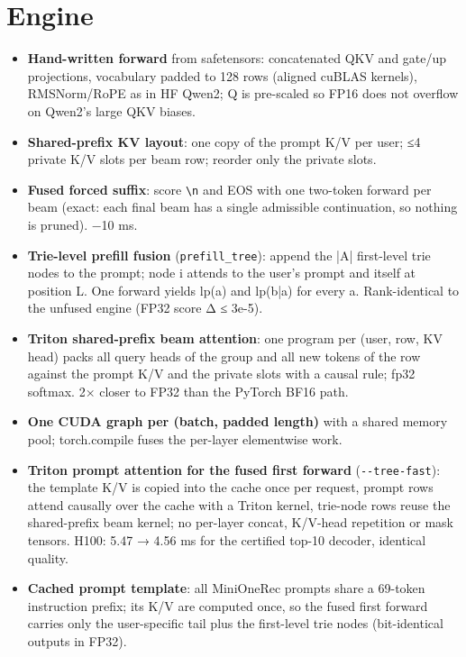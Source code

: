 \documentclass[11pt]{article}
\newcommand{\code}[1]{\texttt{#1}}
\begin{document}
\section{Engine}\label{sec:4}

\begin{itemize}
\item \textbf{Hand-written forward} from safetensors: concatenated QKV and gate/up projections, vocabulary padded to 128 rows (aligned cuBLAS kernels), RMSNorm/RoPE as in HF Qwen2; Q is pre-scaled so FP16 does not overflow on Qwen2's large QKV biases.
\item \textbf{Shared-prefix KV layout}: one copy of the prompt K/V per user; ≤4 private K/V slots per beam row; reorder only the private slots.
\item \textbf{Fused forced suffix}: score \code{\textbackslash{}n} and EOS with one two-token forward per beam (exact: each final beam has a single admissible continuation, so nothing is pruned). −10 ms.
\item \textbf{Trie-level prefill fusion} (\code{prefill\_\allowbreak{}tree}): append the |A| first-level trie nodes to the prompt; node i attends to the user's prompt and itself at position L. One forward yields lp(a) and lp(b|a) for every a. Rank-identical to the unfused engine (FP32 score Δ ≤ 3e-5).
\item \textbf{Triton shared-prefix beam attention}: one program per (user, row, KV head) packs all query heads of the group and all new tokens of the row against the prompt K/V and the private slots with a causal rule; fp32 softmax. 2× closer to FP32 than the PyTorch BF16 path.
\item \textbf{One CUDA graph per (batch, padded length)} with a shared memory pool; torch.compile fuses the per-layer elementwise work.
\end{itemize}

\begin{itemize}
\item \textbf{Triton prompt attention for the fused first forward} (\code{-{}-{}tree-{}fast}): the template K/V is copied into the cache once per request, prompt rows attend causally over the cache with a Triton kernel, trie-node rows reuse the shared-prefix beam kernel; no per-layer concat, K/V-head repetition or mask tensors. H100: 5.47 → 4.56 ms for the certified top-10 decoder, identical quality.
\item \textbf{Cached prompt template}: all MiniOneRec prompts share a 69-token instruction prefix; its K/V are computed once, so the fused first forward carries only the user-specific tail plus the first-level trie nodes (bit-identical outputs in FP32).
\end{itemize}
\end{document}
